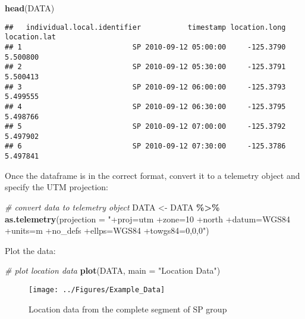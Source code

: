 \documentclass[
]{article}
\newenvironment{Shaded}{\begin{snugshade}}{\end{snugshade}}
\newcommand{\AttributeTok}[1]{\textcolor[rgb]{0.13,0.29,0.53}{#1}}
\newcommand{\CommentTok}[1]{\textcolor[rgb]{0.56,0.35,0.01}{\textit{#1}}}
\newcommand{\FunctionTok}[1]{\textcolor[rgb]{0.13,0.29,0.53}{\textbf{#1}}}
\newcommand{\NormalTok}[1]{#1}
\newcommand{\OtherTok}[1]{\textcolor[rgb]{0.56,0.35,0.01}{#1}}
\newcommand{\SpecialCharTok}[1]{\textcolor[rgb]{0.81,0.36,0.00}{\textbf{#1}}}
\newcommand{\StringTok}[1]{\textcolor[rgb]{0.31,0.60,0.02}{#1}}
\begin{document}
\begin{Shaded}
\begin{Highlighting}[]
\FunctionTok{head}\NormalTok{(DATA)}
\end{Highlighting}
\end{Shaded}

\begin{verbatim}
##   individual.local.identifier           timestamp location.long location.lat
## 1                          SP 2010-09-12 05:00:00     -125.3790     5.500800
## 2                          SP 2010-09-12 05:30:00     -125.3791     5.500413
## 3                          SP 2010-09-12 06:00:00     -125.3793     5.499555
## 4                          SP 2010-09-12 06:30:00     -125.3795     5.498766
## 5                          SP 2010-09-12 07:00:00     -125.3792     5.497902
## 6                          SP 2010-09-12 07:30:00     -125.3786     5.497841
\end{verbatim}

Once the dataframe is in the correct format, convert it to a telemetry
object and specify the UTM projection:

\begin{Shaded}
\begin{Highlighting}[]
\CommentTok{\# convert data to telemetry object}
\NormalTok{DATA }\OtherTok{\textless{}{-}}\NormalTok{ DATA }\SpecialCharTok{\%\textgreater{}\%} 
  \FunctionTok{as.telemetry}\NormalTok{(}\AttributeTok{projection =} \StringTok{"+proj=utm +zone=10 +north +datum=WGS84 +units=m +no\_defs +ellps=WGS84 +towgs84=0,0,0"}\NormalTok{)}
\end{Highlighting}
\end{Shaded}

Plot the data:

\begin{Shaded}
\begin{Highlighting}[]
\CommentTok{\# plot location data}
\FunctionTok{plot}\NormalTok{(DATA, }\AttributeTok{main =} \StringTok{"Location Data"}\NormalTok{)}
\end{Highlighting}
\end{Shaded}

\begin{figure}[H]

{\centering \texttt{[image: ../Figures/Example\_Data]} 

}

\caption{Location data from the complete segment of SP group}\label{fig:unnamed-chunk-10}
\end{figure}
\end{document}
